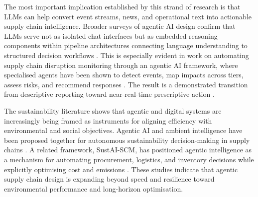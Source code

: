 The most important implication established by this strand of research is that LLMs can help convert event streams, news, and operational text into actionable supply chain intelligence. Broader surveys of agentic AI design confirm that LLMs serve not as isolated chat interfaces but as embedded reasoning components within pipeline architectures connecting language understanding to structured decision workflows \cite{HughesEtAl2025}. This is especially evident in work on automating supply chain disruption monitoring through an agentic AI framework, where specialised agents have been shown to detect events, map impacts across tiers, assess risks, and recommend responses \cite{AlMahriEtAl2026}. The result is a demonstrated transition from descriptive reporting toward near-real-time prescriptive action \cite{AlMahriEtAl2026}.

The sustainability literature shows that agentic and digital systems are increasingly being framed as instruments for aligning efficiency with environmental and social objectives. Agentic AI and ambient intelligence have been proposed together for autonomous sustainability decision-making in supply chains \cite{Tathavadekar2025}. A related framework, SustAI-SCM, has positioned agentic intelligence as a mechanism for automating procurement, logistics, and inventory decisions while explicitly optimising cost and emissions \cite{Aylak2025}. These studies indicate that agentic supply chain design is expanding beyond speed and resilience toward environmental performance and long-horizon optimisation.

